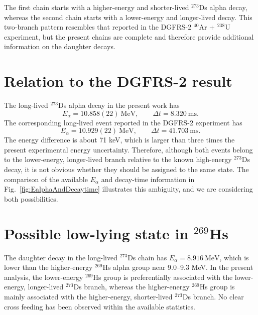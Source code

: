 \documentclass[11pt]{article}
\begin{document}
The first chain starts with a higher-energy and shorter-lived $^{273}$Ds alpha decay, whereas the second chain starts with a lower-energy and longer-lived decay. This two-branch pattern resembles that reported in the DGFRS-2 $^{40}$Ar + $^{238}$U experiment\cite{oganessian2024SynthesisDecayProperties}, but the present chains are complete and therefore provide additional information on the daughter decays.

\section*{Relation to the DGFRS-2 result}

The long-lived $^{273}$Ds alpha decay in the present work has
\[
E_{\alpha}=10.858(22)\ \mathrm{MeV}, \qquad \Delta t=8.320\ \mathrm{ms}.
\]
The corresponding long-lived event reported in the DGFRS-2 experiment \cite{oganessian2024SynthesisDecayProperties} has
\[
E_{\alpha}=10.929(22)\ \mathrm{MeV}, \qquad \Delta t=41.703\ \mathrm{ms}.
\]
The energy difference is about 71 keV, which is larger than three times the present experimental energy uncertainty. Therefore, although both events belong to the lower-energy, longer-lived branch relative to the known high-energy $^{273}$Ds decay, it is not obvious whether they should be assigned to the same state. The comparison of the available $E_{\alpha}$ and decay-time information in Fig.~\ref{fig:EalphaAndDecaytime} illustrates this ambiguity, and we are considering both possibilities.

\section*{Possible low-lying state in $^{269}$Hs}

The daughter decay in the long-lived $^{273}$Ds chain has $E_{\alpha}= 8.916\ \mathrm{MeV}$,
which is lower than the higher-energy $^{269}$Hs alpha group near 9.0--9.3 MeV. In the present analysis, the lower-energy $^{269}$Hs group is preferentially associated with the lower-energy, longer-lived $^{273}$Ds branch, whereas the higher-energy $^{269}$Hs group is mainly associated with the higher-energy, shorter-lived $^{273}$Ds branch. No clear cross feeding has been observed within the available statistics.
\end{document}
